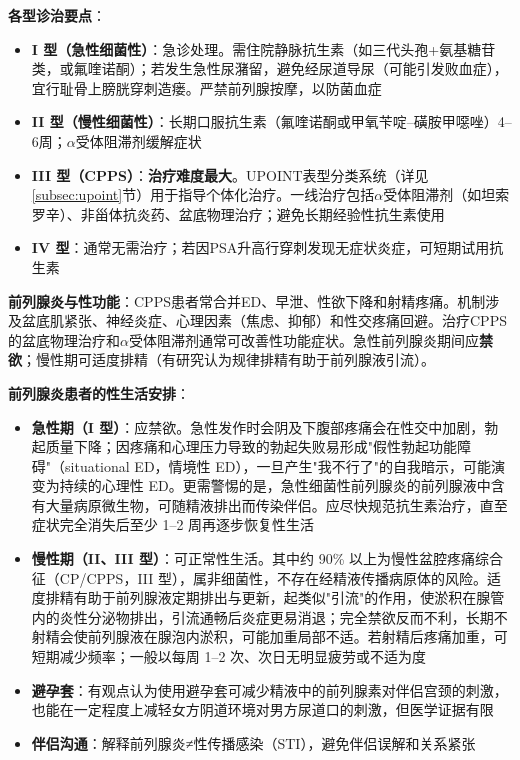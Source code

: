 \documentclass[12pt,a4paper,twoside]{ctexbook}
\begin{document}
\textbf{各型诊治要点}：

\begin{itemize}[leftmargin=2cm]
	\item \textbf{I 型（急性细菌性）}：急诊处理。需住院静脉抗生素（如三代头孢+氨基糖苷类，或氟喹诺酮）；若发生急性尿潴留，避免经尿道导尿（可能引发败血症），宜行耻骨上膀胱穿刺造瘘。严禁前列腺按摩，以防菌血症
	\item \textbf{II 型（慢性细菌性）}：长期口服抗生素（氟喹诺酮或甲氧苄啶--磺胺甲噁唑）4--6周；$\alpha$受体阻滞剂缓解症状
	\item \textbf{III 型（CPPS）}：\textbf{治疗难度最大}。UPOINT表型分类系统（详见\ref{subsec:upoint}节）用于指导个体化治疗。一线治疗包括$\alpha$受体阻滞剂（如坦索罗辛）、非甾体抗炎药、盆底物理治疗；避免长期经验性抗生素使用
	\item \textbf{IV 型}：通常无需治疗；若因PSA升高行穿刺发现无症状炎症，可短期试用抗生素
\end{itemize}

\textbf{前列腺炎与性功能}：CPPS患者常合并ED、早泄、性欲下降和射精疼痛。机制涉及盆底肌紧张、神经炎症、心理因素（焦虑、抑郁）和性交疼痛回避。治疗CPPS的盆底物理治疗和$\alpha$受体阻滞剂通常可改善性功能症状。急性前列腺炎期间应\textbf{禁欲}；慢性期可适度排精（有研究认为规律排精有助于前列腺液引流）。

\textbf{前列腺炎患者的性生活安排}：
\begin{itemize}[leftmargin=2cm]
	\item \textbf{急性期（I 型）}：应禁欲。急性发作时会阴及下腹部疼痛会在性交中加剧，勃起质量下降；因疼痛和心理压力导致的勃起失败易形成"假性勃起功能障碍"（situational ED，情境性 ED），一旦产生"我不行了"的自我暗示，可能演变为持续的心理性 ED。更需警惕的是，急性细菌性前列腺炎的前列腺液中含有大量病原微生物，可随精液排出而传染伴侣。应尽快规范抗生素治疗，直至症状完全消失后至少 1--2 周再逐步恢复性生活
	\item \textbf{慢性期（II、III 型）}：可正常性生活。其中约 90\% 以上为慢性盆腔疼痛综合征（CP/CPPS，III 型），属非细菌性，不存在经精液传播病原体的风险。适度排精有助于前列腺液定期排出与更新，起类似"引流"的作用，使淤积在腺管内的炎性分泌物排出，引流通畅后炎症更易消退；完全禁欲反而不利，长期不射精会使前列腺液在腺泡内淤积，可能加重局部不适。若射精后疼痛加重，可短期减少频率；一般以每周 1--2 次、次日无明显疲劳或不适为度
	\item \textbf{避孕套}：有观点认为使用避孕套可减少精液中的前列腺素对伴侣宫颈的刺激，也能在一定程度上减轻女方阴道环境对男方尿道口的刺激，但医学证据有限
	\item \textbf{伴侣沟通}：解释前列腺炎≠性传播感染（STI），避免伴侣误解和关系紧张
\end{itemize}
\end{document}
